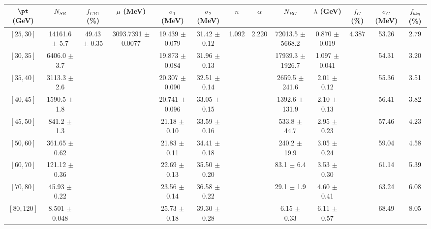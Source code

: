 \begin{tabular}{c||c|c|c|c|c|c|c|c|c|c|c||c}
$\pt$ (GeV) & $N_{SR}$ & $f_{CB1}$ (\%) & $\mu$ (MeV) & $\sigma_1$ (MeV) & $\sigma_2$ (MeV) & $n$ & $\alpha$ & $N_{BG}$ & $\lambda$ (GeV) & $f_G$ (\%) & $\sigma_G$ (MeV) & $f_{bkg}$ (\%) \\
\hline
$[25, 30]$ & 14161.6 $\pm$ 5.7 & \multirow{9}{*}{49.43 $\pm$ 0.35} & \multirow{9}{*}{3093.7391 $\pm$ 0.0077} & 19.439 $\pm$ 0.079 & 31.42 $\pm$ 0.12 & \multirow{9}{*}{1.092} & \multirow{9}{*}{2.220} & 72013.5 $\pm$ 5668.2 & 0.870 $\pm$ 0.019 & \multirow{9}{*}{4.387} & 53.26 & 2.79\\
$[30, 35]$ & 6406.0 $\pm$ 3.7 &  &  & 19.873 $\pm$ 0.084 & 31.96 $\pm$ 0.13 &  &  & 17939.3 $\pm$ 1926.7 & 1.097 $\pm$ 0.041 &  & 54.31 & 3.20\\
$[35, 40]$ & 3113.3 $\pm$ 2.6 &  &  & 20.307 $\pm$ 0.090 & 32.51 $\pm$ 0.14 &  &  & 2659.5 $\pm$ 241.6 & 2.01 $\pm$ 0.12 &  & 55.36 & 3.51\\
$[40, 45]$ & 1590.5 $\pm$ 1.8 &  &  & 20.741 $\pm$ 0.096 & 33.05 $\pm$ 0.15 &  &  & 1392.6 $\pm$ 131.9 & 2.10 $\pm$ 0.13 &  & 56.41 & 3.82\\
$[45, 50]$ & 841.2 $\pm$ 1.3 &  &  & 21.18 $\pm$ 0.10 & 33.59 $\pm$ 0.16 &  &  & 533.8 $\pm$ 44.7 & 2.95 $\pm$ 0.23 &  & 57.46 & 4.23\\
$[50, 60]$ & 361.65 $\pm$ 0.62 &  &  & 21.83 $\pm$ 0.11 & 34.41 $\pm$ 0.18 &  &  & 240.2 $\pm$ 19.9 & 3.05 $\pm$ 0.24 &  & 59.04 & 4.58\\
$[60, 70]$ & 121.12 $\pm$ 0.36 &  &  & 22.69 $\pm$ 0.13 & 35.50 $\pm$ 0.20 &  &  & 83.1 $\pm$ 6.4 & 3.53 $\pm$ 0.30 &  & 61.14 & 5.39\\
$[70, 80]$ & 45.93 $\pm$ 0.22 &  &  & 23.56 $\pm$ 0.14 & 36.58 $\pm$ 0.22 &  &  & 29.1 $\pm$ 1.9 & 4.60 $\pm$ 0.41 &  & 63.24 & 6.08\\
$[80, 120]$ & 8.501 $\pm$ 0.048 &  &  & 25.73 $\pm$ 0.18 & 39.30 $\pm$ 0.28 &  &  & 6.15 $\pm$ 0.33 & 6.11 $\pm$ 0.57 &  & 68.49 & 8.05\\
\end{tabular}
